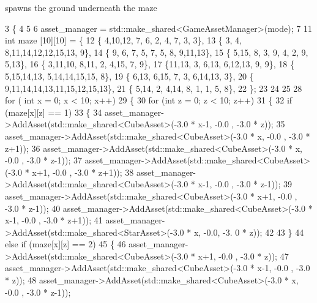 spawns the ground underneath the maze 
\begin{DoxyCode}
3                                           \{
4 
5 
6   asset\_manager = std::make\_shared<GameAssetManager>(mode);
7 
11     \textcolor{keywordtype}{int} maze [10][10] = \{
12 \{ 4,10,12, 7, 6, 2, 4, 7, 3, 3\},
13 \{ 3, 4, 8,11,14,12,12,15,13, 9\},
14 \{ 9, 6, 7, 5, 7, 5, 8, 9,11,13\},
15 \{ 5,15, 8, 3, 9, 4, 2, 9, 5,13\},
16 \{ 3,11,10, 8,11, 2, 4,15, 7, 9\},
17 \{11,13, 3, 6,13, 6,12,13, 9, 9\},
18 \{ 5,15,14,13, 5,14,14,15,15, 8\},
19 \{ 6,13, 6,15, 7, 3, 6,14,13, 3\},
20 \{ 9,11,14,14,13,11,15,12,15,13\},
21 \{ 5,14, 2, 4,14, 8, 1, 1, 5, 8\},
22         \};
23 
24 
25 
28         \textcolor{keywordflow}{for} ( \textcolor{keywordtype}{int} x = 0; x < 10; x++)
29             \{
30                 \textcolor{keywordflow}{for} (\textcolor{keywordtype}{int} z = 0; z < 10; z++)
31                     \{
32                         \textcolor{keywordflow}{if} (maze[x][z] == 1)
33                             \{   
34                                 asset\_manager->AddAsset(std::make\_shared<CubeAsset>(-3.0 * x-1, -0.0 , -3.0
       * z));
35                                 asset\_manager->AddAsset(std::make\_shared<CubeAsset>(-3.0 * x,   -0.0 , -3.0
       * z+1)); 
36                                 asset\_manager->AddAsset(std::make\_shared<CubeAsset>(-3.0 * x,   -0.0 , -3.0
       * z-1)); 
37                                 asset\_manager->AddAsset(std::make\_shared<CubeAsset>(-3.0 * x+1, -0.0 , -3.0
       * z+1));
38                                 asset\_manager->AddAsset(std::make\_shared<CubeAsset>(-3.0 * x-1, -0.0 , -3.0
       * z-1)); 
39                                 asset\_manager->AddAsset(std::make\_shared<CubeAsset>(-3.0 * x+1, -0.0 , -3.0
       * z-1)); 
40                                 asset\_manager->AddAsset(std::make\_shared<CubeAsset>(-3.0 * x-1, -0.0 , -3.0
       * z+1)); 
41                                     asset\_manager->AddAsset(std::make\_shared<StarAsset>(-3.0 * x, -0.0, -3.
      0 * z));
42 
43                             \}
44                     \textcolor{keywordflow}{else} \textcolor{keywordflow}{if} (maze[x][z] == 2)
45                         \{
46                                 asset\_manager->AddAsset(std::make\_shared<CubeAsset>(-3.0 * x+1, -0.0 , -3.0
       * z));
47                                 asset\_manager->AddAsset(std::make\_shared<CubeAsset>(-3.0 * x-1, -0.0 , -3.0
       * z)); 
48                                 asset\_manager->AddAsset(std::make\_shared<CubeAsset>(-3.0 * x,   -0.0 , -3.0
       * z-1)); 

\end{DoxyCode}
